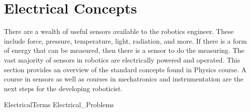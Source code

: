 \hypertarget{Chap:Electical}{%
\section{Electrical Concepts}\label{Chap:Electical}}

There are a wealth of useful sensors available to the robotics engineer.
These include force, pressure, temperature, light, radiation, and more.
If there is a form of energy that can be measured, then there is a
sensor to do the measuring. The vast majority of sensors in robotics are
electrically powered and operated. This section provides an overview of
the standard concepts found in Physics course. A course in sensors as
well as courses in mechatronics and instrumentation are the next steps
for the developing roboticist.

ElectricalTerms Electrical\_Problems
